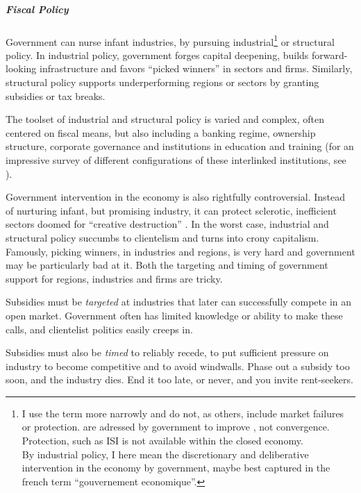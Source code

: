 \subparagraph{Fiscal Policy}
Government can nurse infant industries, by pursuing industrial\footnote{
	I use the term more narrowly and do not, as others, include  market failures or protection.  are adressed by government to improve , not convergence. Protection, such as \gls{ISI} is not available within the closed economy. \\
	By industrial policy, I here mean the discretionary and deliberative intervention in the economy by government, maybe best captured in the french term ``gouvernement economique''.}
or structural policy. In industrial policy, government forges capital deepening, builds forward-looking infrastructure and favors ``picked winners'' in sectors and firms. Similarly, structural policy supports underperforming regions or sectors by granting subsidies or tax breaks.

The toolset of industrial and structural policy is varied and complex, often centered on fiscal means, but also including a banking regime, ownership structure, corporate governance and institutions in education and training (for an impressive survey of different configurations of these interlinked institutions, see \citealt{HallSoskice-2001-aa}).

Government intervention in the economy is also rightfully controversial. Instead of nurturing infant, but promising industry, it can protect sclerotic, inefficient sectors doomed for ``creative destruction'' \citep{SchumpeterSwedberg-1942-aa}. In the worst case, industrial and structural policy succumbs to clientelism and turns into crony capitalism.  Famously, picking winners, in industries and regions, is very hard and government may be particularly bad at it. Both the targeting and timing of government support for regions, industries and firms are tricky.
\begin{inparaenum}
	\item Subsidies must be \emph{targeted} at industries that later can successfully compete in an open market. Government often has limited knowledge or ability to make these calls, and clientelist politics easily creeps in.
	\item Subsidies must also be \emph{timed} to reliably recede, to put sufficient pressure on industry to become competitive and to avoid windwalls. Phase out a subsidy too soon, and the industry dies. End it too late, or never, and you invite rent-seekers.
\end{inparaenum}

